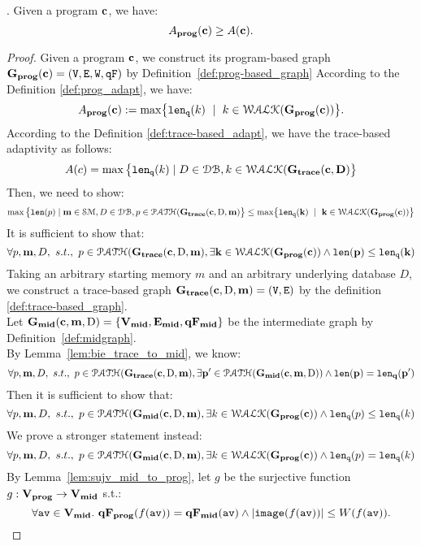 {
  \begin{thm}.
  Given a program ${\boldsymbol{\mathbf{c}}}$, we have:
  \[
  A_{\bf{prog}}({\boldsymbol{\mathbf{c}}}) \geq A({\boldsymbol{\mathbf{c}}}).
  \]
  \end{thm}
}
\begin{proof}
Given a program ${\boldsymbol{\mathbf{c}}}$, 
we construct its program-based graph $\mathtt{\bf{G_{prog}}}({\boldsymbol{\mathbf{c}}}) = (\mathtt{V}, \mathtt{E}, \mathtt{W}, \mathtt{qF})$
by Definition~\ref{def:prog-based_graph}
According to the Definition \ref{def:prog_adapt}, we have:
%
\[
  \progA(\ssa{c}) 
  := \max\left\{ \qlen(k)\ \mid \  k\in \walks(\progG(\ssa{c}))\right \}.
\]
%
According to the Definition \ref{def:trace-based_adapt}, we have the trace-based adaptivity as follows:
$$
A(c) = \max \big 
\{ \mathtt{len}_{\tt q}(k) \mid D \in \mathcal{DB} , k \in \mathcal{WALK}(\bf{G_{trace}}(c, D) \big \} 
$$
%
Then, we need to show:
\[
\max \big 
\{ \len(p) \mid \ssa{m} \in \mathcal{SM},D \in \dbdom ,p \in \paths(\traceG(\ssa{c}, \text{D}, \ssa{m}) \big \} 
\leq
\max\left\{ \qlen(k) \ \mid \  k\in \walks(\progG(\ssa{c}))\right \}
\]
%
It is sufficient to show that:
\[
  \forall p, {\boldsymbol{\mathbf{m}}}, D, ~ s.t., ~ p \in \mathcal{PATH}(\bf{G_{trace}}({\boldsymbol{\mathbf{c}}}, \text{D}, {\boldsymbol{\mathbf{m}}}),
  \exists k \in \mathcal{WALK}(\mathtt{\bf{G_{prog}}}({\boldsymbol{\mathbf{c}}})) \land 
  \mathtt{len}(p) \leq \mathtt{len}_{\tt q}(k)
\]
%
Taking an arbitrary starting memory $m$ and an arbitrary underlying database $D$,
we construct a trace-based graph $\bf{G_{trace}}({\boldsymbol{\mathbf{c}}}, \text{D}, {\boldsymbol{\mathbf{m}}}) = (\mathtt{V}, \mathtt{E})$ by the definition \ref{def:trace-based_graph}.
%
\\
%
Let $\mathtt{\bf{G_{mid}}}({\boldsymbol{\mathbf{c}}},{\boldsymbol{\mathbf{m}}},\text{D}) = \{\mathtt{\bf{V_{mid}}}, \mathtt{\bf{E_{mid}}}, \mathtt{\bf{qF_{mid}}}\}$ be the intermediate graph by Definition~\ref{def:midgraph}.
\\
By Lemma~\ref{lem:bie_trace_to_mid}, we know:
\[
  \forall p, {\boldsymbol{\mathbf{m}}}, D, ~ s.t., ~ p \in \mathcal{PATH}(\bf{G_{trace}}({\boldsymbol{\mathbf{c}}}, \text{D}, {\boldsymbol{\mathbf{m}}}),
  \exists p' \in \mathcal{PATH}(\mathtt{\bf{G_{mid}}}({\boldsymbol{\mathbf{c}}},{\boldsymbol{\mathbf{m}}},\text{D})) \land 
  \mathtt{len}(p) = \mathtt{len}_q(p')
\]
%
Then it is sufficient to show that:
%
\[
  \forall p, {\boldsymbol{\mathbf{m}}}, D, ~ s.t., ~ p \in \mathcal{PATH}(\mathtt{\bf{G_{mid}}}({\boldsymbol{\mathbf{c}}}, \text{D}, {\boldsymbol{\mathbf{m}}}),
  \exists k \in \mathcal{WALK}(\mathtt{\bf{G_{prog}}}({\boldsymbol{\mathbf{c}}})) \land 
  \mathtt{len}_{\tt q}(p) \leq \mathtt{len}_{\tt q}(k)
\]
%
We prove a stronger statement instead:
\[
  \forall p, {\boldsymbol{\mathbf{m}}}, D, ~ s.t., ~ p \in \mathcal{PATH}(\mathtt{\bf{G_{mid}}}({\boldsymbol{\mathbf{c}}}, \text{D}, {\boldsymbol{\mathbf{m}}}),
  \exists k \in \mathcal{WALK}(\mathtt{\bf{G_{prog}}}({\boldsymbol{\mathbf{c}}})) \land 
  \mathtt{len}_{\tt q}(p) = \mathtt{len}_{\tt q}(k) 
\]
%
%
By Lemma~\ref{lem:sujv_mid_to_prog}, let $g$ be the surjective function $g: \mathtt{\bf{V_{prog}}} \to \mathtt{\bf{V_{mid}}}$ s.t.:
%
$$
\forall \mathtt{av} \in \mathtt{\bf{V_{mid}}}. ~ \mathtt{\bf{qF_{prog}}}(f(\mathtt{av})) = \mathtt{\bf{qF_{mid}}}(\mathtt{av}) 
\land |\mathtt{image}(f(\mathtt{av}))| \leq W(f(\mathtt{av})).
$$
%
%

\end{proof}
